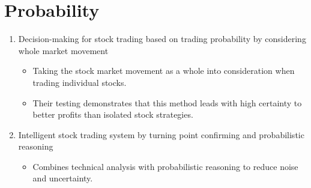 \section{Probability}
    \begin{enumerate}
    
        \item Decision-making for stock trading based on trading probability by considering whole market movement
        \cite{huang2004decision}
        \begin{itemize}
            \item Taking the stock market movement as a whole into consideration when trading individual stocks.
            \item Their testing demonstrates that this method leads with high certainty to better profits than isolated stock strategies.
        \end{itemize}

        \item Intelligent stock trading system by turning point confirming and probabilistic reasoning
        \cite{bao2008intelligent}
        \begin{itemize}
            \item Combines technical analysis with probabilistic reasoning to reduce noise and uncertainty.
        \end{itemize}
        
    \end{enumerate}

